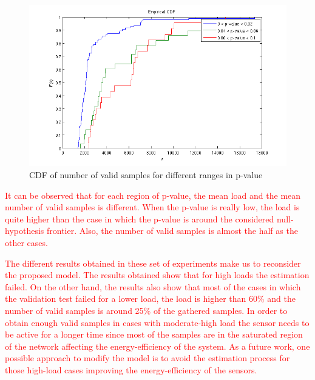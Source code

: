 \begin{figure}[h!]
	\centering
	\includegraphics[scale=0.5, trim = 0mm 0mm 0mm 0mm, clip]{images/results/GlobalView/flows/limited_load/cdf_of_valid}
	\caption{CDF of number of valid samples for different ranges in p-value}
	\label{fig:ks_fails_load_valid_samples_cdf}
\end{figure}

\textcolor{red}{ It can be observed that for each region of p-value, the mean load and the mean number of valid samples is different. When the p-value is really low, the load is quite higher than the case in which the p-value is around the considered null-hypothesis frontier. Also, the number of valid samples is almost the half as the other cases.}

\textcolor{red}{ The different results obtained in these set of experiments make us to reconsider the proposed model. The results obtained show that for high loads the estimation failed. On the other hand, the results also show that most of the cases in which the validation test failed for a lower load, the load is higher than 60\% and the number of valid samples is around 25\% of the gathered samples. In order to obtain enough valid samples in cases with moderate-high load the sensor needs to be active for a longer time since most of the samples are in the saturated region of the network affecting the energy-efficiency of the system. As a future work, one possible approach to modify the model is to avoid the estimation process for those high-load cases improving the energy-efficiency of the sensors.}